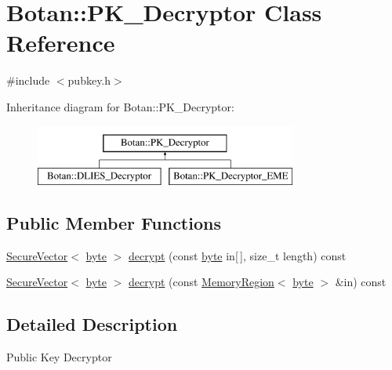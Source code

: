 \hypertarget{classBotan_1_1PK__Decryptor}{\section{Botan\-:\-:P\-K\-\_\-\-Decryptor Class Reference}
\label{classBotan_1_1PK__Decryptor}
}


{\ttfamily \#include $<$pubkey.\-h$>$}

Inheritance diagram for Botan\-:\-:P\-K\-\_\-\-Decryptor\-:\begin{figure}[H]
\begin{center}
\leavevmode
\includegraphics[height=2.000000cm]{classBotan_1_1PK__Decryptor}
\end{center}
\end{figure}
\subsection*{Public Member Functions}
\begin{DoxyCompactItemize}
\item 
\hyperlink{classBotan_1_1SecureVector}{Secure\-Vector}$<$ \hyperlink{namespaceBotan_a7d793989d801281df48c6b19616b8b84}{byte} $>$ \hyperlink{classBotan_1_1PK__Decryptor_a9792b02161f569ed276be24a365d1f3b}{decrypt} (const \hyperlink{namespaceBotan_a7d793989d801281df48c6b19616b8b84}{byte} in\mbox{[}$\,$\mbox{]}, size\-\_\-t length) const 
\item 
\hyperlink{classBotan_1_1SecureVector}{Secure\-Vector}$<$ \hyperlink{namespaceBotan_a7d793989d801281df48c6b19616b8b84}{byte} $>$ \hyperlink{classBotan_1_1PK__Decryptor_a8f2fbe5ba5b6be2e980c8c126b4a1676}{decrypt} (const \hyperlink{classBotan_1_1MemoryRegion}{Memory\-Region}$<$ \hyperlink{namespaceBotan_a7d793989d801281df48c6b19616b8b84}{byte} $>$ \&in) const 
\end{DoxyCompactItemize}


\subsection{Detailed Description}
Public Key Decryptor 

